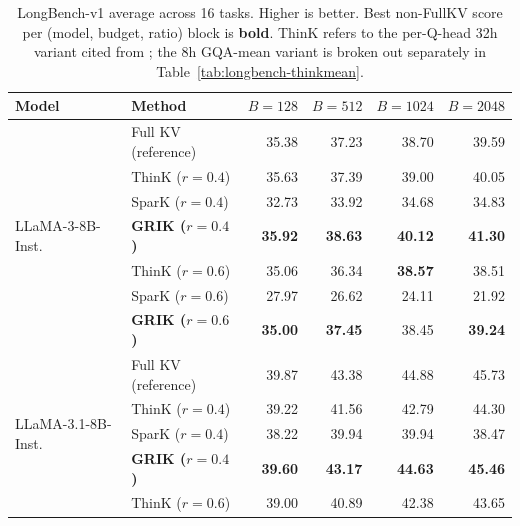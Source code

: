 \begin{table}[t]
\centering
\small
\setlength{\tabcolsep}{6pt}
\renewcommand{\arraystretch}{1.05}
\caption{LongBench-v1 average across 16 tasks. Higher is better. Best non-FullKV
score per (model, budget, ratio) block is \textbf{bold}. ThinK refers to the
per-Q-head 32h variant cited from \citet{think}; the 8h GQA-mean variant is
broken out separately in Table~\ref{tab:longbench-thinkmean}.}
\label{tab:longbench-main}
\begin{tabular}{llrrrr}
\toprule
Model & Method & $B{=}128$ & $B{=}512$ & $B{=}1024$ & $B{=}2048$ \\
\midrule
\multirow{7}{*}{LLaMA-3-8B-Inst.}
 & Full KV (reference)                    & 35.38          & 37.23          & 38.70          & 39.59          \\
\cmidrule(lr){2-6}
 & ThinK ($r{=}0.4$)                      & 35.63          & 37.39          & 39.00          & 40.05          \\
 & SparK ($r{=}0.4$)                      & 32.73          & 33.92          & 34.68          & 34.83          \\
 & \textbf{GRIK ($r{=}0.4$)}              & \textbf{35.92} & \textbf{38.63} & \textbf{40.12} & \textbf{41.30} \\
\cmidrule(lr){2-6}
 & ThinK ($r{=}0.6$)                      & 35.06          & 36.34          & \textbf{38.57} & 38.51          \\
 & SparK ($r{=}0.6$)                      & 27.97          & 26.62          & 24.11          & 21.92          \\
 & \textbf{GRIK ($r{=}0.6$)}              & \textbf{35.00} & \textbf{37.45} & 38.45          & \textbf{39.24} \\
\midrule
\multirow{7}{*}{LLaMA-3.1-8B-Inst.}
 & Full KV (reference)                    & 39.87          & 43.38          & 44.88          & 45.73          \\
\cmidrule(lr){2-6}
 & ThinK ($r{=}0.4$)                      & 39.22          & 41.56          & 42.79          & 44.30          \\
 & SparK ($r{=}0.4$)                      & 38.22          & 39.94          & 39.94          & 38.47          \\
 & \textbf{GRIK ($r{=}0.4$)}              & \textbf{39.60} & \textbf{43.17} & \textbf{44.63} & \textbf{45.46} \\
\cmidrule(lr){2-6}
 & ThinK ($r{=}0.6$)                      & 39.00          & 40.89          & 42.38          & 43.65          \\

\end{tabular}
\end{table}
